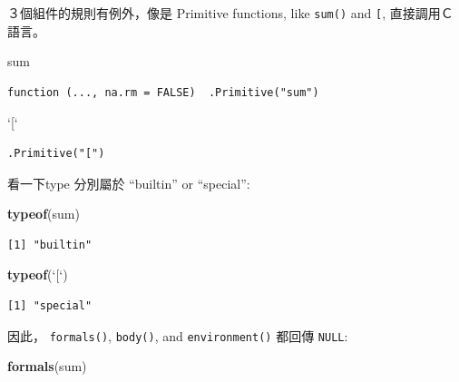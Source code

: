 \documentclass[]{book}
\newenvironment{Shaded}{\begin{snugshade}}{\end{snugshade}}
\newcommand{\DataTypeTok}[1]{\textcolor[rgb]{0.13,0.29,0.53}{#1}}
\newcommand{\KeywordTok}[1]{\textcolor[rgb]{0.13,0.29,0.53}{\textbf{#1}}}
\newcommand{\NormalTok}[1]{#1}
\newcommand{\StringTok}[1]{\textcolor[rgb]{0.31,0.60,0.02}{#1}}
\theoremstyle{definition}
\theoremstyle{definition}
\theoremstyle{definition}
\theoremstyle{remark}
\begin{document}
３個組件的規則有例外，像是 Primitive functions, like \texttt{sum()} and
\texttt{{[}}, 直接調用Ｃ語言。

\begin{Shaded}
\begin{Highlighting}[]
\NormalTok{sum}
\end{Highlighting}
\end{Shaded}

\begin{verbatim}
function (..., na.rm = FALSE)  .Primitive("sum")
\end{verbatim}

\begin{Shaded}
\begin{Highlighting}[]
\StringTok{`}\DataTypeTok{[}\StringTok{`}
\end{Highlighting}
\end{Shaded}

\begin{verbatim}
.Primitive("[")
\end{verbatim}

看一下type 分別屬於 ``builtin'' or ``special'':

\begin{Shaded}
\begin{Highlighting}[]
\KeywordTok{typeof}\NormalTok{(sum)}
\end{Highlighting}
\end{Shaded}

\begin{verbatim}
[1] "builtin"
\end{verbatim}

\begin{Shaded}
\begin{Highlighting}[]
\KeywordTok{typeof}\NormalTok{(}\StringTok{`}\DataTypeTok{[}\StringTok{`}\NormalTok{)}
\end{Highlighting}
\end{Shaded}

\begin{verbatim}
[1] "special"
\end{verbatim}

因此， \texttt{formals()}, \texttt{body()}, and \texttt{environment()}
都回傳 \texttt{NULL}:

\begin{Shaded}
\begin{Highlighting}[]
\KeywordTok{formals}\NormalTok{(sum)}
\end{Highlighting}
\end{Shaded}
\end{document}

